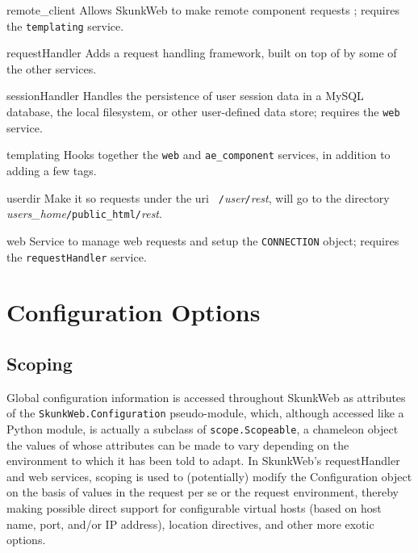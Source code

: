 \documentclass[titlepage]{manual}
\begin{document}
\begin{argdesc}
\item[remote_client] Allows SkunkWeb to make remote component requests
; requires the \texttt{templating} service.

\item[requestHandler]  Adds a request handling framework, built on top
of by some of the other services.

\item[sessionHandler]  Handles the persistence of user session data in
a MySQL database, the local filesystem, or other user-defined data store; 
requires the \texttt{web} service.

\item[templating] Hooks together the \texttt{web} and \texttt{ae_component}
services, in addition to adding a few tags.

\item[userdir] Make it so requests under the uri
\texttt{~/}\emph{user}\texttt{/}\emph{rest}, will go to the directory
\emph{users\_home}\texttt{/public_html/}\emph{rest}.


\item[web] Service to manage web requests and setup the
\texttt{CONNECTION} object; requires the \texttt{requestHandler} service.
\end{argdesc}

\section{Configuration Options}

\subsection{Scoping}

Global configuration information is accessed throughout SkunkWeb as attributes of the 
\texttt{SkunkWeb.Configuration} pseudo-module, which, although accessed like a Python module,
is actually a subclass of \texttt{scope.Scopeable}, a chameleon object the values of whose attributes can be 
made to vary depending on the environment to which it has been told to adapt.
In SkunkWeb's requestHandler and web services, scoping is used to (potentially) modify the Configuration
object on the basis of values in the request per se or the request environment, thereby making possible
direct support for configurable virtual hosts (based on host name, port, and/or IP address), 
location directives, and other more exotic options.
\end{document}
